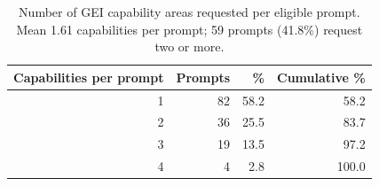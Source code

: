 \begin{table}[htbp]
\centering
\caption{Number of GEI capability areas requested per eligible prompt. Mean 1.61 capabilities per prompt; 59 prompts (41.8\%) request two or more.}
\label{tab:s5-composition-depth}
\begin{tabular}{rrrr}
\toprule
Capabilities per prompt & Prompts & \% & Cumulative \% \\
\midrule
1 & 82 & 58.2 & 58.2 \\
2 & 36 & 25.5 & 83.7 \\
3 & 19 & 13.5 & 97.2 \\
4 & 4 & 2.8 & 100.0 \\
\bottomrule
\end{tabular}
\par{}
\end{table}
